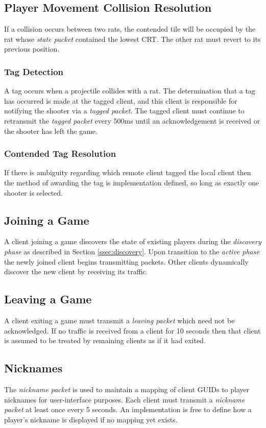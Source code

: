 \documentclass{article}
\begin{document}
\subsection{Player Movement Collision Resolution}
If a collision occurs between two rats, the contended tile will be
occupied by the rat whose \textit{state packet} contained the lowest CRT. The
other rat must revert to its previous position.

\subsubsection{Tag Detection}
\label{ssec:tagging}
A tag occurs when a projectile collides with a rat. The determination
that a tag has occurred is made at the tagged client, and this client is
responsible for notifying the shooter via a \textit{tagged packet}.
The tagged client must continue to retransmit the \textit{tagged packet}
every 500ms until an acknowledgement is received or the shooter has left
the game.

\subsubsection{Contended Tag Resolution}
If there is ambiguity regarding which remote client tagged the local
client then the method of awarding the tag is implementation defined, so
long as exactly one shooter is selected.

\subsection{Joining a Game}
A client joining a game discovers the state of existing players during
the \textit{discovery phase} as described in Section \ref{ssec:discovery}.
Upon transition to the \textit{active phase} the newly joined client
begins transmitting packets.  Other clients dynamically discover the new
client by receiving its traffic.

\subsection{Leaving a Game}
A client exiting a game must transmit a \textit{leaving packet} which
need not be acknowledged.  If no traffic is received from a client for
10 seconds then that client is assumed to be treated by remaining
clients as if it had exited.

\subsection{Nicknames}
The \textit{nickname packet} is used to maintain a mapping of client
GUIDs to player nicknames for user-interface purposes.  Each client must
transmit a \textit{nickname packet} at least once every 5 seconds.  An
implementation is free to define how a player's nickname is displayed if
no mapping yet exists.
\end{document}
